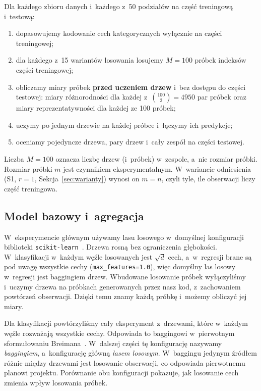 \documentclass[11pt,a4paper]{article}
\begin{document}
Dla każdego zbioru danych i~każdego z~50 podziałów na część treningową i~testową:
\begin{enumerate}
  \item dopasowujemy kodowanie cech kategorycznych wyłącznie na części treningowej;
  \item dla każdego z~15 wariantów losowania losujemy $M=100$ próbek indeksów części treningowej;
  \item obliczamy miary próbek \textbf{przed uczeniem drzew} i~bez dostępu do części testowej: miary różnorodności dla każdej z~$\binom{100}{2}=4950$ par próbek oraz miary reprezentatywności dla każdej ze 100 próbek;
  \item uczymy po jednym drzewie na każdej próbce i~łączymy ich predykcje;
  \item oceniamy pojedyncze drzewa, pary drzew i~cały zespół na części testowej.
\end{enumerate}
Liczba $M=100$ oznacza liczbę drzew (i~próbek) w~zespole, a~nie rozmiar próbki. Rozmiar próbki $m$ jest czynnikiem eksperymentalnym. W~wariancie odniesienia (S1, $r=1$, Sekcja~\ref{sec:warianty}) wynosi on $m=n$, czyli tyle, ile obserwacji liczy część treningowa.

\subsection{Model bazowy i~agregacja}
\label{sec:model}

W~eksperymencie głównym używamy lasu losowego w~domyślnej konfiguracji biblioteki \texttt{scikit-learn}~\cite{sklearn}. Drzewa rosną bez ograniczenia głębokości. W~klasyfikacji w~każdym węźle losowanych jest $\sqrt{d}$ cech, a~w~regresji brane są pod uwagę wszystkie cechy (\texttt{max\_features=1.0}), więc domyślny las losowy w~regresji jest baggingiem drzew. Wbudowane losowanie próbek wyłączyliśmy i~uczymy drzewa na próbkach generowanych przez nasz kod, z~zachowaniem powtórzeń obserwacji. Dzięki temu znamy każdą próbkę i~możemy obliczyć jej miary.

Dla klasyfikacji powtórzyliśmy cały eksperyment z~drzewami, które w~każdym węźle rozważają wszystkie cechy. Odpowiada to baggingowi w~pierwotnym sformułowaniu Breimana~\cite{breiman1996}. W~dalszej części tę konfigurację nazywamy \emph{baggingiem}, a~konfigurację główną \emph{lasem losowym}. W~baggingu jedynym źródłem różnic między drzewami jest losowanie obserwacji, co odpowiada pierwotnemu planowi projektu. Porównanie obu konfiguracji pokazuje, jak losowanie cech zmienia wpływ losowania próbek.
\end{document}

